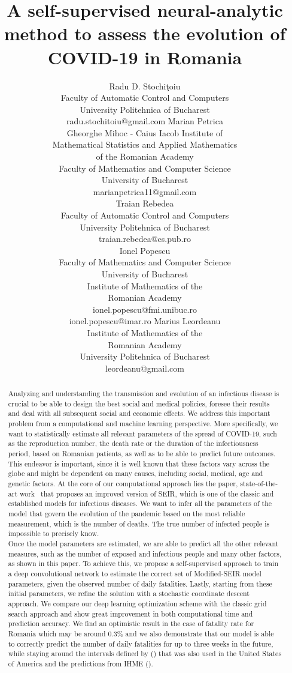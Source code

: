 \documentclass[11pt]{article}
\title{A self-supervised neural-analytic method to assess the evolution of COVID-19 in Romania}
\author{
  Radu D. Stochi\c{t}oiu \\
  {\small Faculty of Automatic Control and Computers}\\
  {\small University Politehnica of Bucharest} \\
  {\small radu.stochitoiu@gmail.com}
   \And
   Marian Petrica \\
   {\small Gheorghe Mihoc - Caius Iacob Institute of}\\
   {\small Mathematical Statistics and Applied Mathematics}\\
   {\small of the Romanian Academy}\\
   {\small Faculty of Mathematics and Computer Science}\\
   {\small University of Bucharest}\\
   {\small marianpetrica11@gmail.com} \\
   \And
   Traian Rebedea \\
   {\small Faculty of Automatic Control and Computers}\\
   {\small University Politehnica of Bucharest}\\
   {\small traian.rebedea@cs.pub.ro} \\
   \And
   Ionel Popescu \\
   {\small Faculty of Mathematics and Computer Science}\\ {\small University of Bucharest} \\
   {\small Institute of Mathematics of the} \\
   {\small Romanian Academy} \\
   {\small ionel.popescu@fmi.unibuc.ro\\ ionel.popescu@imar.ro}
   \And
   Marius Leordeanu \\
   {\small Institute of Mathematics of the} \\
   {\small Romanian Academy} \\
   {\small University Politehnica of Bucharest} \\
   {\small leordeanu@gmail.com} \\
}
\begin{document}
\maketitle

\begin{abstract}
  Analyzing and understanding the transmission and evolution of an infectious disease is crucial to be able to design the best social and medical policies, foresee their results and deal with all subsequent social and economic effects. We address this important problem from a computational and machine learning perspective. More specifically, we want to statistically estimate all relevant parameters of the spread of COVID-19, such as the reproduction number, the death rate or the duration of the infectiousness period, based on Romanian patients, as well as to be able to predict future outcomes. This endeavor is important, since it is well known that these factors vary across the globe and might be dependent on many causes, including social, medical, age and genetic factors. At the core of our computational approach lies the paper, state-of-the-art work~\cite{chowdhury2020dynamic} that proposes an improved version of SEIR, which is one of the classic and established models for infectious diseases. We want to infer all the parameters of the model that govern the evolution of the pandemic based on the most reliable measurement, which is the number of deaths. The true number of infected people is impossible to precisely know.\\
  Once the model parameters are estimated, we are able to predict all the other relevant measures, such as the number of exposed and infectious people and many other factors, as shown in this paper. To achieve this, we propose a self-supervised approach to train a deep convolutional network to estimate the correct set of Modified-SEIR model parameters, given the observed number of daily fatalities. Lastly, starting from these initial parameters, we refine the solution with a stochastic coordinate descent approach. We compare our deep learning optimization scheme with the classic grid search approach and show great improvement in both computational time and prediction accuracy. We find an optimistic result in the case of fatality rate for Romania which may be around 0.3\% and we also demonstrate that our model is able to correctly predict the number of daily fatalities for up to three weeks in the future, while staying around the intervals defined by (\cite{Youyanggu}) that was also used in the United States of America and the predictions from IHME (\cite{2020.04.21.20074732}).
\end{abstract}
\end{document}
